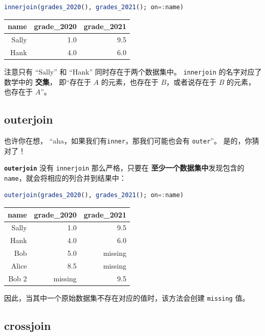 \documentclass[
  notoc %
]{tufte-book}
\newcommand{\passthrough}[1]{#1}
\begin{document}
\begin{lstlisting}[language=Julia]
innerjoin(grades_2020(), grades_2021(); on=:name)
\end{lstlisting}

\begin{longtable}[]{@{}rrr@{}}
\toprule
name & grade\_2020 & grade\_2021 \\
\midrule
\endhead
Sally & 1.0 & 9.5 \\
Hank & 4.0 & 6.0 \\
\bottomrule
\end{longtable}

注意只有 ``Sally'' 和 ``Hank'' 同时存在于两个数据集中。
\passthrough{\lstinline!innerjoin!} 的名字对应了数学中的 \textbf{交集}，
即``存在于 \(A\) 的元素，也存在于 \(B\)，或者说存在于 \(B\)
的元素，也存在于 \(A\)''。

\hypertarget{sec:outerjoin}{%
\subsection{outerjoin}\label{sec:outerjoin}}

也许你在想，
``aha，如果我们有\passthrough{\lstinline!inner!}，那我们可能也会有
\passthrough{\lstinline!outer!}''。 是的，你猜对了！

\textbf{\passthrough{\lstinline!outerjoin!}} 没有
\passthrough{\lstinline!innerjoin!} 那么严格，只要在
\textbf{至少一个数据集中}发现包含的
\passthrough{\lstinline!name!}，就会将相应的列合并到结果中：

\begin{lstlisting}[language=Julia]
outerjoin(grades_2020(), grades_2021(); on=:name)
\end{lstlisting}

\begin{longtable}[]{@{}rrr@{}}
\toprule
name & grade\_2020 & grade\_2021 \\
\midrule
\endhead
Sally & 1.0 & 9.5 \\
Hank & 4.0 & 6.0 \\
Bob & 5.0 & missing \\
Alice & 8.5 & missing \\
Bob 2 & missing & 9.5 \\
\bottomrule
\end{longtable}

因此，当其中一个原始数据集不存在对应的值时，该方法会创建
\passthrough{\lstinline!missing!} 值。

\hypertarget{sec:crossjoin}{%
\subsection{crossjoin}\label{sec:crossjoin}}
\end{document}
